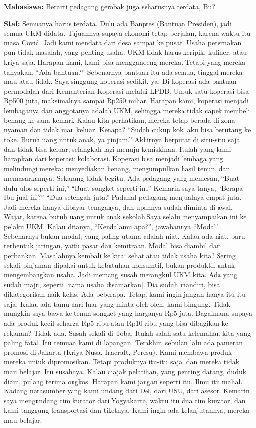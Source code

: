 {\noindent \textbf{Mahasiswa:} Berarti pedagang gerobak juga seharusnya terdata, Bu?

\noindent \textbf{Staf:} Semuanya harus terdata. Dulu ada Banpres (Bantuan Presiden), jadi semua UKM didata. Tujuannya supaya ekonomi tetap berjalan, karena waktu itu masa Covid. Jadi kami mendata dari desa sampai ke pusat. Usaha peternakan pun tidak masalah, yang penting usaha. UKM tidak harus keripik, kuliner, atau kriya saja. Harapan kami, kami bisa menggandeng mereka. Tetapi yang mereka tanyakan, ``Ada bantuan?'' Sebenarnya bantuan itu ada semua, tinggal mereka mau atau tidak. Saya singgung koperasi sedikit, ya. Di koperasi ada bantuan permodalan dari Kementerian Koperasi melalui LPDB. Untuk satu koperasi bisa Rp500 juta, maksimalnya sampai Rp250 miliar. Harapan kami, koperasi menjadi lembaganya dan anggotanya adalah UKM, sehingga mereka tidak capek membeli benang ke sana kemari. Kalau kita perhatikan, mereka tetap berada di zona nyaman dan tidak mau keluar. Kenapa? ``Sudah cukup kok, aku bisa berutang ke toke. Butuh uang untuk anak, ya pinjam.'' Akhirnya berputar di situ-situ saja dan tidak bisa keluar; selangkah lagi menuju kemiskinan. Itulah yang kami harapkan dari koperasi: kolaborasi. Koperasi bisa menjadi lembaga yang melindungi mereka: menyediakan benang, mengumpulkan hasil tenun, dan memasarkannya. Sekarang tidak begitu. Ada pedagang yang memesan, ``Buat dulu ulos seperti ini,'' ``Buat songket seperti ini.'' Kemarin saya tanya, ``Berapa Ibu jual ini?'' ``Dua setengah juta.'' Padahal pedagang menjualnya empat juta. Jadi mereka hanya dibayar tenaganya, dan upahnya sudah diminta di awal. Wajar, karena butuh uang untuk anak sekolah.Saya selalu menyampaikan ini ke pelaku UKM. Kalau ditanya, ``Kendalamu apa?'', jawabannya ``Modal.'' Sebenarnya bukan modal; yang paling utama adalah niat. Kalau ada niat, baru terbentuk jaringan, yaitu pasar dan kemitraan. Modal bisa diambil dari perbankan. Masalahnya kembali ke kita: sehat atau tidak usaha kita? Sering sekali pinjaman dipakai untuk kebutuhan konsumtif, bukan produktif  untuk mengembangkan usaha. Jadi memang susah merangkul UKM kita. Ada yang sudah maju, seperti [nama usaha disamarkan]. Dia sudah mandiri, bisa dikategorikan naik kelas. Ada beberapa. Tetapi kami ingin jangan hanya itu-itu saja. Kalau ada tamu dari luar yang minta oleh-oleh, kami bingung. Tidak mungkin saya bawa ke tenun songket yang harganya Rp5 juta. Bagaimana supaya ada produk kecil seharga Rp5 ribu atau Rp10 ribu yang bisa dibagikan ke rekanan? Tidak ada. Susah sekali di Toba. Itulah salah satu kelemahan kita yang paling fatal. Itu temuan kami di lapangan. Terakhir, sebulan lalu ada pameran promosi di Jakarta (Kriya Nusa, Inacraft, Peresu). Kami membawa produk mereka untuk dipromosikan. Tetapi produknya itu-itu saja, dan mereka tidak mau belajar. Itu susahnya. Kalau diajak pelatihan, yang penting datang, duduk diam, pulang terima ongkos. Harapan kami jangan seperti itu. Ilmu itu mahal. Kadang narasumber yang kami undang dari Del, dari USU, dari asesor. Kemarin saya mengundang tim kurator dari Yogyakarta, waktu itu dua tim kurator, dan kami tanggung transportasi dan tiketnya. Kami ingin ada kelanjutannya, mereka mau belajar.

}

